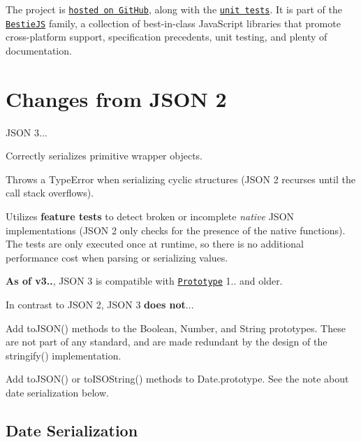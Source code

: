 The project is \href{http://git.io/json3}{\tt hosted on Git\+Hub}, along with the \href{http://bestiejs.github.io/json3/test/test_browser.html}{\tt unit tests}. It is part of the \href{https://github.com/bestiejs}{\tt Bestie\+JS} family, a collection of best-\/in-\/class Java\+Script libraries that promote cross-\/platform support, specification precedents, unit testing, and plenty of documentation.

\section*{Changes from J\+S\+ON 2}

J\+S\+ON 3...


\begin{DoxyItemize}
\item Correctly serializes primitive wrapper objects.
\item Throws a {\ttfamily Type\+Error} when serializing cyclic structures (J\+S\+ON 2 recurses until the call stack overflows).
\item Utilizes {\bfseries feature tests} to detect broken or incomplete {\itshape native} J\+S\+ON implementations (J\+S\+ON 2 only checks for the presence of the native functions). The tests are only executed once at runtime, so there is no additional performance cost when parsing or serializing values.
\end{DoxyItemize}

{\bfseries As of v3..}, J\+S\+ON 3 is compatible with \href{http://prototypejs.org}{\tt Prototype} 1.. and older.

In contrast to J\+S\+ON 2, J\+S\+ON 3 {\bfseries does not}...


\begin{DoxyItemize}
\item Add {\ttfamily to\+J\+S\+O\+N()} methods to the {\ttfamily Boolean}, {\ttfamily Number}, and {\ttfamily String} prototypes. These are not part of any standard, and are made redundant by the design of the {\ttfamily stringify()} implementation.
\item Add {\ttfamily to\+J\+S\+O\+N()} or {\ttfamily to\+I\+S\+O\+String()} methods to {\ttfamily Date.\+prototype}. See the note about date serialization below.
\end{DoxyItemize}

\subsection*{Date Serialization}

